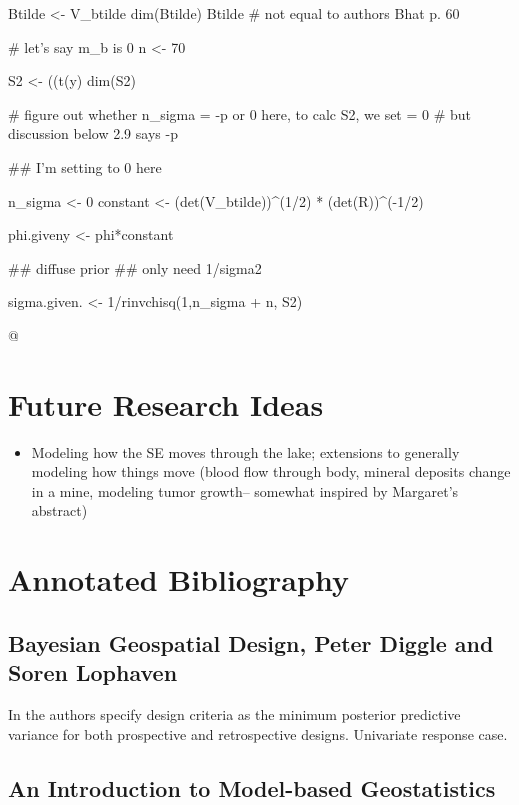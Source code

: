 \documentclass[a4paper]{article}
\begin{document}
Btilde <- V_btilde %
dim(Btilde)
Btilde # not equal to authors Bhat p. 60

# let's say m_b is 0
n <- 70

S2 <- ((t(y) %
dim(S2)

# figure out whether n_sigma = -p or 0 here, to calc S2, we set = 0
# but discussion below 2.9 says -p

## I'm setting to 0 here

n_sigma <- 0
constant <- (det(V_btilde))^(1/2) * (det(R))^(-1/2) %

phi.giveny <- phi*constant

## diffuse prior
## only need 1/sigma2

sigma.given. <- 1/rinvchisq(1,n_sigma + n, S2)


@

\section*{Future Research Ideas}
\begin{itemize}
\item Modeling how the SE moves through the lake; extensions to generally modeling how things move (blood flow through body, mineral deposits change in a mine, modeling tumor growth-- somewhat inspired by Margaret's abstract)

\end{itemize}


\newpage
\section*{Annotated Bibliography}


\subsection*{Bayesian Geospatial Design, Peter Diggle and Soren Lophaven}
In \cite{diggle2006} the authors specify design criteria as the minimum posterior predictive variance for both prospective and retrospective designs. Univariate response case. 


\subsection*{An Introduction to Model-based Geostatistics}
\end{document}
